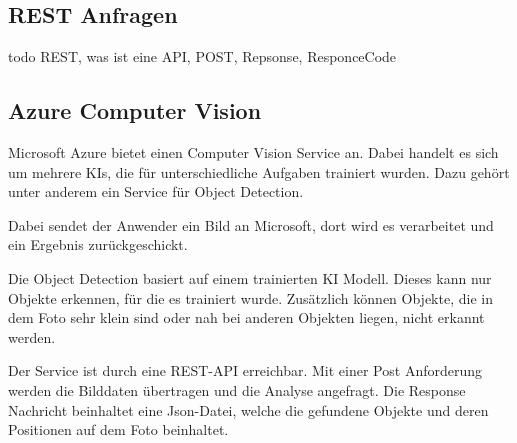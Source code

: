\documentclass[german,a4paper, 12pt]{llncs}
\begin{document}


\subsection{REST Anfragen}
todo
REST, was ist eine API, POST, Repsonse, ResponceCode

\subsection{Azure Computer Vision}
Microsoft Azure bietet einen Computer Vision Service an. Dabei handelt es sich um mehrere KIs, die für unterschiedliche Aufgaben trainiert wurden. Dazu gehört unter anderem ein Service für Object Detection.

Dabei sendet der Anwender ein Bild an Microsoft, dort wird es verarbeitet und ein Ergebnis zurückgeschickt.\cite{getAzure,whatIsAzure,objDetectAzure,Azure302Doc}

Die Object Detection basiert auf einem trainierten KI Modell. Dieses kann nur Objekte erkennen, für die es trainiert wurde.
Zusätzlich können Objekte, die in dem Foto sehr klein sind oder nah bei anderen Objekten liegen, nicht erkannt werden.\cite{azureobjdetec}

Der Service ist durch eine REST-API erreichbar. Mit einer Post Anforderung werden die Bilddaten übertragen und die Analyse angefragt. Die Response Nachricht beinhaltet eine Json-Datei, welche die gefundene Objekte und deren Positionen auf dem Foto beinhaltet. 

\end{document}
